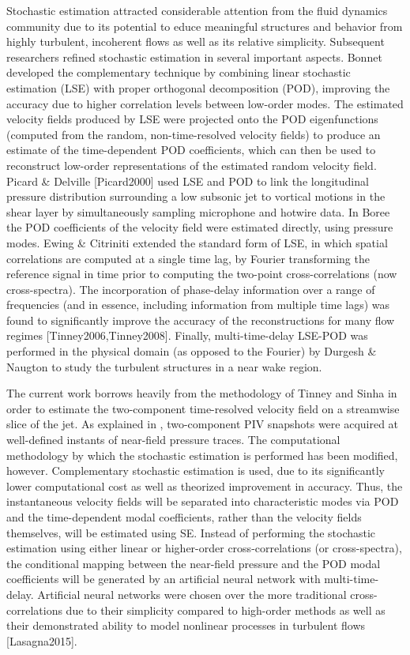 Stochastic estimation attracted considerable attention from the fluid dynamics community due to its potential to educe meaningful structures and behavior from highly turbulent, incoherent flows as well as its relative simplicity.
Subsequent researchers refined stochastic estimation in several important aspects.
Bonnet \etal \citep{Bonnet1994} developed the complementary technique by combining linear stochastic estimation (LSE) with proper orthogonal decomposition (POD), improving the accuracy due to higher correlation levels between low-order modes.
The estimated velocity fields produced by LSE were projected onto the POD eigenfunctions (computed from the random, non-time-resolved velocity fields) to produce an estimate of the time-dependent POD coefficients, which can then be used to reconstruct low-order representations of the estimated random velocity field.
Picard \& Delville [Picard2000] used LSE and POD to link the longitudinal pressure distribution surrounding a low subsonic jet to vortical motions in the shear layer by simultaneously sampling microphone and hotwire data.
In Boree \citep{Boree2003} the POD coefficients of the velocity field were estimated directly, using pressure modes.
Ewing \& Citriniti \citep{Ewing1997} extended the standard form of LSE, in which spatial correlations are computed at a single time lag, by Fourier transforming the reference signal in time prior to computing the two-point cross-correlations (now cross-spectra). 
The incorporation of phase-delay information over a range of frequencies (and in essence, including information from multiple time lags) was found to significantly improve the accuracy of the reconstructions for many flow regimes \citep{Ewing1997} [Tinney2006,Tinney2008].
Finally, multi-time-delay LSE-POD was performed in the physical domain (as opposed to the Fourier) by Durgesh \& Naugton \citep{Durgesh2010} to study the turbulent structures in a near wake region.

The current work borrows heavily from the methodology of Tinney \etal [TinneyJFM2008] and Sinha \etal [SinhaIJFC2010] in order to estimate the two-component time-resolved velocity field on a streamwise slice of the jet.
As explained in , two-component PIV snapshots were acquired at well-defined instants of near-field pressure traces.
The computational methodology by which the stochastic estimation is performed has been modified, however.
Complementary stochastic estimation is used, due to its significantly lower computational cost as well as theorized improvement in accuracy.
Thus, the instantaneous velocity fields will be separated into characteristic modes via POD and the time-dependent modal coefficients, rather than the velocity fields themselves, will be estimated using SE.
Instead of performing the stochastic estimation using either linear or higher-order cross-correlations (or cross-spectra), the conditional mapping between the near-field pressure and the POD modal coefficients will be generated by an artificial neural network with multi-time-delay.
Artificial neural networks were chosen over the more traditional cross-correlations due to their simplicity compared to high-order methods as well as their demonstrated ability to model nonlinear processes in turbulent flows [Lasagna2015].

